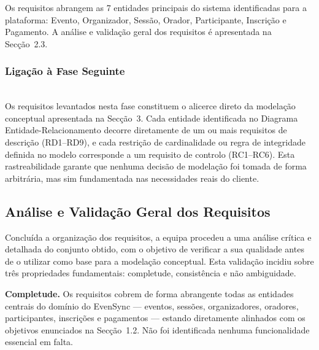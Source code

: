 \documentclass[runningheads]{llncs}
\begin{document}
                Os requisitos abrangem as 7 entidades principais do sistema identificadas para a
                plataforma: Evento, Organizador, Sessão, Orador, Participante, Inscrição e Pagamento. A
                análise e validação geral dos requisitos é apresentada na Secção~2.3.

                \subsubsection{Ligação à Fase Seguinte}\mbox{}\\

                Os requisitos levantados nesta fase constituem o alicerce direto da modelação conceptual
                apresentada na Secção~3. Cada entidade identificada no Diagrama Entidade-Relacionamento
                decorre diretamente de um ou mais requisitos de descrição (RD1--RD9), e cada restrição de
                cardinalidade ou regra de integridade definida no modelo corresponde a um requisito de
                controlo (RC1--RC6). Esta rastreabilidade garante que nenhuma decisão de modelação
                foi tomada de forma arbitrária, mas sim fundamentada nas necessidades reais do cliente.

                \subsection{Análise e Validação Geral dos Requisitos}

                Concluída a organização dos requisitos, a equipa procedeu a uma análise crítica e detalhada
                do conjunto obtido, com o objetivo de verificar a sua qualidade antes de o utilizar como base
                para a modelação conceptual. Esta validação incidiu sobre três propriedades fundamentais:
                completude, consistência e não ambiguidade.

                \vspace{0.2cm}

                \textbf{Completude.} Os requisitos cobrem de forma abrangente todas as entidades centrais
                do domínio do EvenSync --- eventos, sessões, organizadores, oradores, participantes,
                inscrições e pagamentos --- estando diretamente alinhados com os objetivos enunciados
                na Secção~1.2. Não foi identificada nenhuma funcionalidade essencial em falta.

                \vspace{0.2cm}
\end{document}
